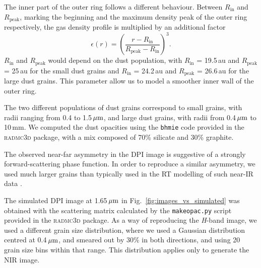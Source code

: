 \documentclass[letters,usenatbib,times]{mnras}
\begin{document}
The inner part of the outer ring follows a different behaviour. Between $R_\mathrm{in}$ and $R_\mathrm{peak}$, marking the beginning and the maximum density peak of the outer ring respectively, the gas density profile is multiplied by an additional factor
\begin{equation}
    \epsilon(r) = \left(\frac{ r - R_\mathrm{in}}{R_\mathrm{peak} - R_\mathrm{in}}\right)^3.
\end{equation}
$R_\mathrm{in}$ and $R_\mathrm{peak}$ would depend on the dust population, with $R_\mathrm{in}$ = 19.5\,au and $R_\mathrm{peak}$ = 25\,au for the small dust grains and $R_\mathrm{in}$ = 24.2\,au and $R_\mathrm{peak}$ = 26.6\,au for the large dust grains. This parameter allow us to model a smoother inner wall of the outer ring.

The two different populations of dust grains correspond to small grains, with radii ranging from 0.4 to 1.5\,$\hbox{$\mu$m}$, and large dust grains, with radii from 0.4\,$\hbox{$\mu$m}$ to 10\,mm. We computed the dust opacities using the {\tt bhmie} code provided in the \textsc{radmc3d} package, with a mix composed of 70\% silicate and 30\% graphite. 

The observed near-far asymmetry in the DPI image is suggestive of a strongly forward-scattering phase function. In order to reproduce a similar asymmetry, we used much larger grains than typically used in the RT modelling of such near-IR data \citep[e.g.,][]{2018MNRAS.477.5104C}. 

The simulated DPI image at 1.65\,$\hbox{$\mu$m}$ in Fig.~\ref{fig:images_vs_simulated} was obtained with the scattering matrix calculated by the {\tt makeopac.py} script provided in the \textsc{radmc3d} package. As a way of reproducing the \textit{H}-band image, we used a different grain size distribution, where we used a Gaussian distribution centred at 0.4\,$\hbox{$\mu$m}$, and smeared out by 30\% in both directions, and using 20 grain size bins within that range. This distribution applies only to generate the NIR image.
\end{document}
